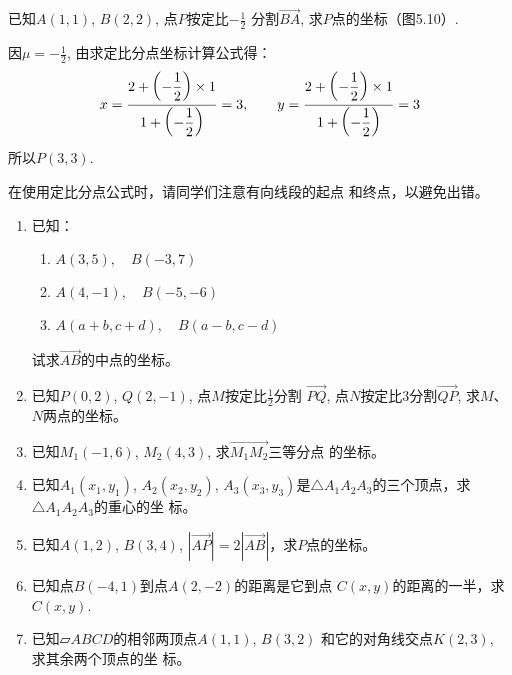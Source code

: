 \begin{example}
    已知$A(1,1)$, $B(2,2)$, 点$P$按定比$-\frac{1}{2}$
分割$\Vec{BA}$, 求$P$点的坐标（图5.10）.
\end{example}

\begin{solution}
因$\mu=-\frac{1}{2}$, 由求定比分点坐标计算公式得：
\[
    x=\dfrac{2+\left(-\dfrac{1}{2}\right)\times 1}{1+\left(-\dfrac{1}{2}\right)}=3,\qquad
    y=\dfrac{2+\left(-\dfrac{1}{2}\right)\times 1}{1+\left(-\dfrac{1}{2}\right)}=3
\]
所以$P(3,3)$.
\end{solution}

在使用定比分点公式时，请同学们注意有向线段的起点
和终点，以避免出错。

\begin{ex}
\begin{enumerate}
    \item 已知：
\begin{enumerate}
    \item $A(3,5),\quad B(-3,7)$
    \item $A(4,-1),\quad B(-5,-6)$
    \item $A(a+b,c+d),\quad B(a-b,c-d)$
\end{enumerate}
    试求$\Vec{AB}$的中点的坐标。
    \item 已知$P(0,2)$, $Q(2,-1)$, 点$M$按定比$\frac{1}{2}$分割
    $\Vec{PQ}$, 点$N$按定比3分割$\Vec{QP}$, 求$M$、$N$两点的坐标。
    \item 已知$M_1(-1,6)$, $M_2(4,3)$, 求$\Vec{M_1M_2}$三等分点
    的坐标。
    \item 已知$A_1(x_1,y_1)$, $A_2(x_2,y_2)$, $A_3(x_3,y_3)$是$\triangle A_1A_2A_3$的三个顶点，求$\triangle A_1A_2A_3$的重心的坐
    标。
    \item 已知$A(1,2)$, $B(3,4)$, 
    $|\Vec{AP}|=2|\Vec{AB}|$，求$P$点的坐标。
    \item 已知点$B(-4,1)$到点$A(2,-2)$的距离是它到点
    $C(x,y)$的距离的一半，求$C(x,y)$.
    \item 已知$\parallelogram{ABCD}$的相邻两顶点$A(1,1)$, $B(3,2)$
    和它的对角线交点$K(2,3)$, 求其余两个顶点的坐
    标。
\end{enumerate}
\end{ex}



\begin{example}
    
\end{example}

\begin{solution}
    
\end{solution}


